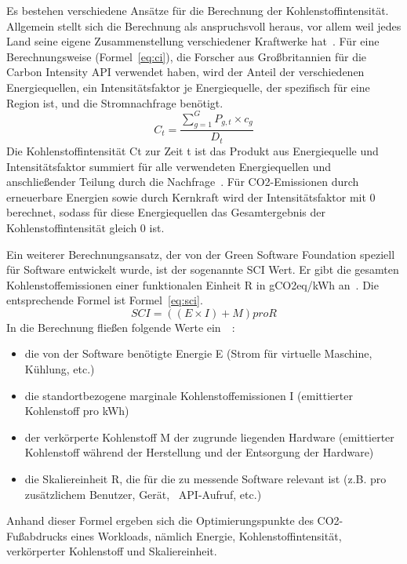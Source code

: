 Es bestehen verschiedene Ansätze für die Berechnung der Kohlenstoffintensität.
Allgemein stellt sich die Berechnung als anspruchsvoll heraus, vor allem weil jedes Land seine eigene Zusammenstellung verschiedener Kraftwerke hat~\cite{Currie.2024}.
Für eine Berechnungsweise (Formel~\ref{eq:ci}), die Forscher aus Großbritannien für die Carbon Intensity \ac{API} verwendet haben, wird der Anteil der verschiedenen Energiequellen, ein Intensitätsfaktor je Energiequelle, der spezifisch für eine Region ist, und die Stromnachfrage benötigt.
\begin{equation}
 \label{eq:ci}
 C_t = \frac{\sum_{g=1}^{G} P_{g,t} \times c_g}{D_t}
\end{equation}
Die Kohlenstoffintensität Ct zur Zeit t ist das Produkt aus Energiequelle und Intensitätsfaktor summiert für alle verwendeten Energiequellen und anschließender Teilung durch die Nachfrage~\cite{LyndonRuff.20220420T15:34:17.000Z}.
Für \ac{CO2}-Emissionen durch erneuerbare Energien sowie durch Kernkraft wird der Intensitätsfaktor mit 0 berechnet, sodass für diese Energiequellen das Gesamtergebnis der Kohlenstoffintensität gleich 0 ist.

Ein weiterer Berechnungsansatz, der von der Green Software Foundation speziell für Software entwickelt wurde, ist der sogenannte \ac{SCI} Wert.
Er gibt die gesamten Kohlenstoffemissionen einer funktionalen Einheit R in g\ac{CO2}eq/\ac{kWh} an~\cite{GreenSoftwareFoundation.2022}.
Die entsprechende Formel ist Formel~\ref{eq:sci}.
\begin{equation}
 \label{eq:sci}
 SCI = ((E \times I) + M) pro R
\end{equation}
In die Berechnung fließen folgende Werte ein~\cite{Buchanan.2023}~\cite{GreenSoftwareFoundation.2022}:
\begin{itemize}
 \item die von der Software benötigte Energie E (Strom für virtuelle Maschine, Kühlung, etc.)
 \item die standortbezogene marginale Kohlenstoffemissionen I (emittierter Kohlenstoff pro \ac{kWh})
 \item der verkörperte Kohlenstoff M der zugrunde liegenden Hardware (emittierter Kohlenstoff während der Herstellung und der Entsorgung der Hardware)
 \item die Skaliereinheit R, die für die zu messende Software relevant ist (z.B. pro zusätzlichem Benutzer, Gerät, ~\ac{API}-Aufruf, etc.)
\end{itemize}
Anhand dieser Formel ergeben sich die Optimierungspunkte des \ac{CO2}-Fußabdrucks eines Workloads, nämlich Energie, Kohlenstoffintensität, verkörperter Kohlenstoff und Skaliereinheit.

